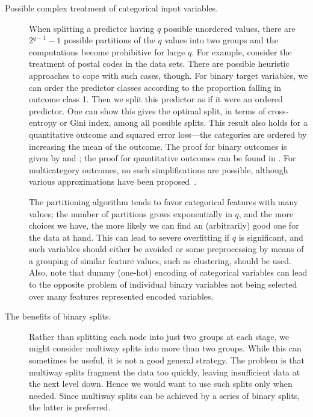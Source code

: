 \begin{refsection}
\begin{description}
\item[Possible complex treatment of categorical input variables.] When splitting a predictor having $q$ possible unordered values, there are $2^{q-1}-1$ possible partitions of the $q$ values into two groups and the computations become prohibitive for large $q$. For example, consider the treatment of postal codes in the data sets. There are possible heuristic approaches to cope with such cases, though. For binary target variables, we can order the predictor classes according to the proportion falling in outcome class 1. Then we split this predictor as if it were an ordered predictor. One can show this gives the optimal split, in terms of cross-entropy or Gini index, among all possible splits. This result also holds for a quantitative outcome and squared error loss—the categories are ordered by increasing the mean of the outcome. The proof for binary outcomes is given by \citet{Brieman1984} and \citet{Ripley1996}; the proof for quantitative outcomes can be found in \citet{Fisher1958}. For multicategory outcomes, no such simplifications are possible, although various approximations have been proposed~\citep{Loh1988}.

The partitioning algorithm tends to favor categorical features with many values; the number of partitions grows exponentially in $q$, and the more choices we have, the more likely we can find an (arbitrarily) good one for the data at hand. This can lead to severe overfitting if $q$ is significant, and such variables should either be avoided or some preprocessing by means of a grouping of similar feature values, such as clustering, should be used. Also, note that dummy (one-hot) encoding of categorical variables can lead to the opposite problem of individual binary variables not being selected over many features represented encoded variables.

\item[The benefits of binary splits.] Rather than splitting each node into just two groups at each stage, we might consider multiway splits into more than two groups. While this can sometimes be useful, it is not a good general strategy. The problem is that multiway splits fragment the data too quickly, leaving insufficient data at the next level down. Hence we would want to use such splits only when needed. Since multiway splits can be achieved by a series of binary splits, the latter is preferred.


\end{description}
\end{refsection}
